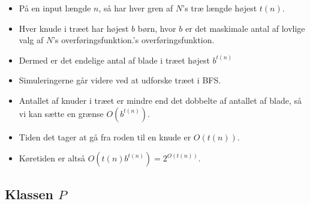 \begin{frame}[allowframebreaks]
	\begin{itemize}
		\item På en input længde $n$, så har hver gren af $N$'s træ længde højest $t(n)$.
		\item Hver knude i træet har højest $b$ børn, hvor $b$ er det maskimale antal af lovlige valg af $N$'s overføringsfunktion.'s overføringsfunktion.
		\item Dermed er det endelige antal af blade i træet højest $b^{t(n)}$
		\item Simuleringerne går videre ved at udforske træet i BFS.
		\item Antallet af knuder i træet er mindre end det dobbelte af antallet af blade, så vi kan sætte en grænse $O(b^{t(n)})$.
		\item Tiden det tager at gå fra roden til en knude er $O(t(n))$.
		\item Køretiden er altså $O(t(n)b^{t(n)}) = 2^{O(t(n))}$.
	\end{itemize}
\end{frame}

\subsection{Klassen $P$}%
\label{subsec:label}

